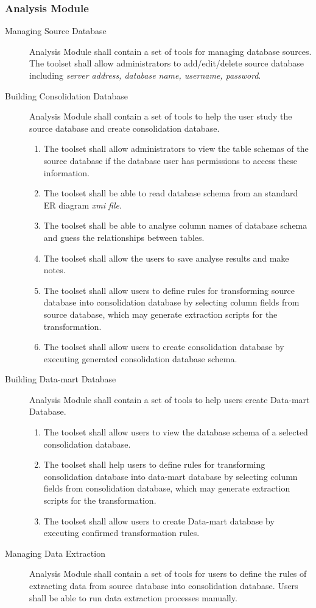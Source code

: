 \documentclass[11pt]{article}
\begin{document}
\subsubsection{Analysis Module}
\begin{description}
  \item[Managing Source Database] Analysis Module shall contain a set of tools for managing database sources. The toolset shall allow administrators to add/edit/delete source database including \textit{server address, database name, username, password}.
  \item[Building Consolidation Database] Analysis Module shall contain a set of tools to help the user study the source database and create consolidation database.
    \begin{enumerate}
      \item The toolset shall allow administrators to view the table schemas of the source database if the database user has permissions to access these information.
      \item The toolset shall be able to read database schema from an standard ER diagram \textit{xmi file}.
      \item The toolset shall be able to analyse column names of database schema and guess the relationships between tables.
      \item The toolset shall allow the users to save analyse results and make notes.
      \item The toolset shall allow users to define rules for transforming source database into consolidation database by selecting column fields from source database, which may generate extraction scripts for the transformation.
      \item The toolset shall allow users to create consolidation database by executing generated consolidation database schema.
    \end{enumerate}
  \item[Building Data-mart Database] Analysis Module shall contain a set of tools to help users create Data-mart Database.
    \begin{enumerate}
      \item The toolset shall allow users to view the database schema of a selected consolidation database.
      \item The toolset shall help users to define rules for transforming consolidation database into data-mart database by selecting column fields from consolidation database, which may generate extraction scripts for the transformation.
      \item The toolset shall allow users to create Data-mart database by executing confirmed transformation rules.
    \end{enumerate}
  \item[Managing Data Extraction] Analysis Module shall contain a set of tools for users to define the rules of extracting data from source database into consolidation database. Users shall be able to run data extraction processes manually.
\end{description}
\end{document}
